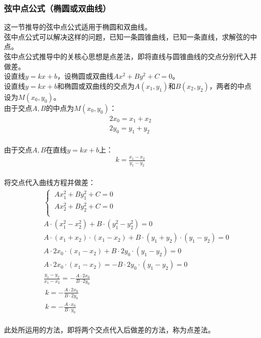 \documentclass[UTF8]{ctexart}
\begin{document}
\subsubsection{弦中点公式（椭圆或双曲线）}
    \setcounter{equation}{0}
    这一节推导的弦中点公式适用于椭圆和双曲线。\\[3mm]
    弦中点公式可以解决这样的问题，已知一条圆锥曲线，已知一条直线，求解弦的中点。\\[3mm]
    弦中点公式推导中的关核心思想是点差法，即将直线与圆锥曲线的交点分别代入并做差。\\[3mm]
    设直线$y=kx+b$，设椭圆或双曲线$Ax^2+By^2+C=0$。\\[3mm]
    设直线$y=kx+b$和椭圆或双曲线的交点为$A(x_1,y_1)$和$B(x_2,y_2)$，两者的中点设为$M(x_0,y_0)$。\\[6mm]
    由于交点$A,B$的中点为$M(x_0,y_0)$：
    \begin{align}
        2x_0=x_1+x_2\\[3mm]
        2y_0=y_1+y_2
    \end{align}\\
    由于交点$A,B$在直线$y=kx+b$上：
    \begin{align}
        k=\frac{x_1-x_2}{y_1-y_2}
    \end{align}\\
    将交点代入曲线方程并做差：\vspace{5pt}
    \begin{align}
        &~~~~\begin{cases}
            ~Ax_1^2+By_1^2+C=0\\[1mm]
            ~Ax_2^2+By_2^2+C=0\\[1mm]
        \end{cases}\\[3mm]
        &~~~~A\cdot(x_1^2-x_2^2)+B\cdot(y_1^2-y_2^2)=0\\[3mm]
        &~~~~A\cdot(x_1+x_2)\cdot(x_1-x_2)+B\cdot(y_1+y_2)\cdot(y_1-y_2)=0\\[3mm]
        &~~~~A\cdot 2x_0\cdot(x_1-x_2)+B\cdot 2y_0\cdot(y_1-y_2)=0\\[3mm]
        &~~~~A\cdot 2x_0\cdot(x_1-x_2)=-B\cdot 2y_0\cdot(y_1-y_2)=0\\[3mm]
        &~~~~\frac{y_1-y_2}{x_1-x_2}=-\frac{A\cdot 2x_0}{B\cdot 2y_0}\\[3mm]
        &~~~~~k=-\frac{A\cdot 2x_0}{B\cdot 2y_0}\\[3mm]
        &~~~~~k=-\frac{A\cdot x_0}{B\cdot y_0}
    \end{align}\\
    此处所运用的方法，即将两个交点代入后做差的方法，称为点差法。
\end{document}
